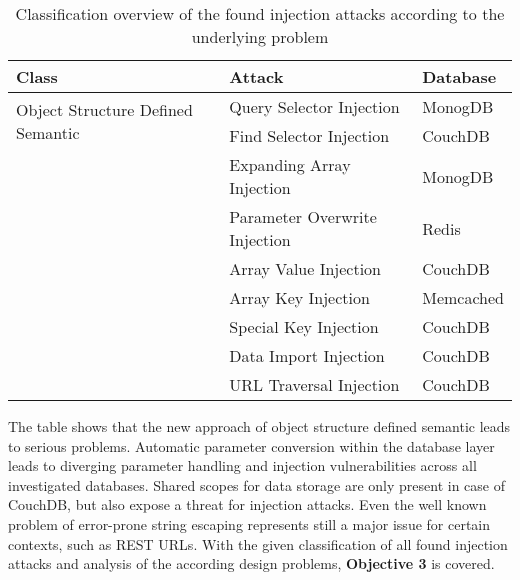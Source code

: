 \begin{table}[h]
  \sffamily
  \centering 
  \begin{tabular}{lll}
  \textbf{Class} & \textbf{Attack} & \textbf{Database} \\ \hline
  \multirow{2}{*}{Object Structure Defined Semantic}
    & Query Selector Injection & MonogDB \\
    & Find Selector Injection & CouchDB \\ \hdashline
  \multirow{4}{*}{Diverging Parameter Handling}
    & Expanding Array Injection & MonogDB \\
    & Parameter Overwrite Injection & Redis \\
    & Array Value Injection & CouchDB \\
    & Array Key Injection & Memcached \\ \hdashline
  \multirow{2}{*}{Shared Scope for Data}
    & Special Key Injection & CouchDB \\
    & Data Import Injection & CouchDB \\ \hdashline
  \multirow{1}{*}{Error-prone String Escaping}
    & URL Traversal Injection & CouchDB \\ \hline
  \end{tabular}
  \caption{Classification overview of the found injection attacks according to the underlying problem}
  \label{tab:attack_classification_overview}
\end{table}

The table shows that the new approach of object structure defined semantic leads to serious problems. Automatic parameter conversion within the database layer leads to diverging parameter handling and injection vulnerabilities across all investigated databases. Shared scopes for data storage are only present in case of CouchDB, but also expose a threat for injection attacks. Even the well known problem of error-prone string escaping represents still a major issue for certain contexts, such as REST URLs. With the given classification of all found injection attacks and analysis of the according design problems, \textbf{Objective 3} is covered.